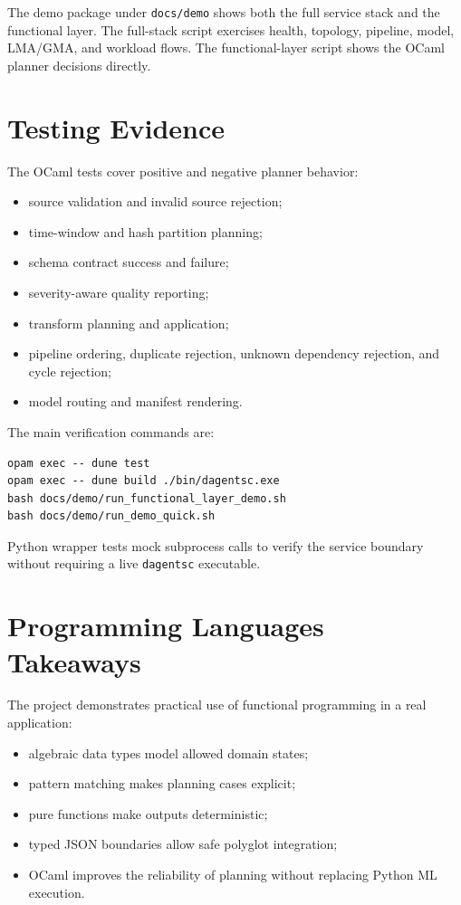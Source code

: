 \documentclass[conference]{IEEEtran}
\begin{document}
The demo package under \texttt{docs/demo} shows both the full service stack and
the functional layer. The full-stack script exercises health, topology,
pipeline, model, LMA/GMA, and workload flows. The functional-layer script shows
the OCaml planner decisions directly.

\section{Testing Evidence}

The OCaml tests cover positive and negative planner behavior:

\begin{itemize}
  \item source validation and invalid source rejection;
  \item time-window and hash partition planning;
  \item schema contract success and failure;
  \item severity-aware quality reporting;
  \item transform planning and application;
  \item pipeline ordering, duplicate rejection, unknown dependency rejection,
  and cycle rejection;
  \item model routing and manifest rendering.
\end{itemize}

The main verification commands are:

\begin{lstlisting}[style=demostyle]
opam exec -- dune test
opam exec -- dune build ./bin/dagentsc.exe
bash docs/demo/run_functional_layer_demo.sh
bash docs/demo/run_demo_quick.sh
\end{lstlisting}

Python wrapper tests mock subprocess calls to verify the service boundary
without requiring a live \texttt{dagentsc} executable.

\section{Programming Languages Takeaways}

The project demonstrates practical use of functional programming in a real
application:

\begin{itemize}
  \item algebraic data types model allowed domain states;
  \item pattern matching makes planning cases explicit;
  \item pure functions make outputs deterministic;
  \item typed JSON boundaries allow safe polyglot integration;
  \item OCaml improves the reliability of planning without replacing Python ML
  execution.
\end{itemize}
\end{document}

